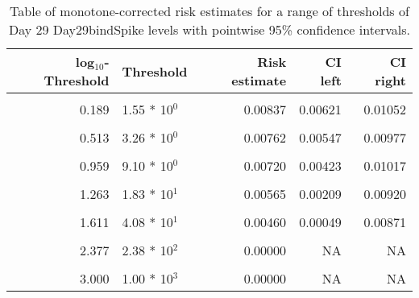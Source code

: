 \documentclass[]{article}
\begin{document}
\begin{table}[!h]

\caption{\label{tab:unnamed-chunk-44}Table of monotone-corrected risk estimates for a range of thresholds of Day 29 Day29bindSpike levels with pointwise 95\% confidence intervals.}
\centering
\begin{tabular}[t]{rlrrr}
\toprule
log$_{10}$-Threshold & Threshold & Risk estimate & CI left & CI right\\
\midrule
\cellcolor{gray!6}{-0.813} & \cellcolor{gray!6}{1.54 * 10$^{1}$} & \cellcolor{gray!6}{0.00878} & \cellcolor{gray!6}{0.00676} & \cellcolor{gray!6}{0.01080}\\
0.189 & 1.55 * 10$^{0}$ & 0.00837 & 0.00621 & 0.01052\\
\cellcolor{gray!6}{0.341} & \cellcolor{gray!6}{2.19 * 10$^{0}$} & \cellcolor{gray!6}{0.00820} & \cellcolor{gray!6}{0.00605} & \cellcolor{gray!6}{0.01034}\\
0.513 & 3.26 * 10$^{0}$ & 0.00762 & 0.00547 & 0.00977\\
\cellcolor{gray!6}{0.792} & \cellcolor{gray!6}{6.19 * 10$^{0}$} & \cellcolor{gray!6}{0.00749} & \cellcolor{gray!6}{0.00506} & \cellcolor{gray!6}{0.00993}\\
0.959 & 9.10 * 10$^{0}$ & 0.00720 & 0.00423 & 0.01017\\
\cellcolor{gray!6}{1.113} & \cellcolor{gray!6}{1.30 * 10$^{1}$} & \cellcolor{gray!6}{0.00639} & \cellcolor{gray!6}{0.00297} & \cellcolor{gray!6}{0.00981}\\
1.263 & 1.83 * 10$^{1}$ & 0.00565 & 0.00209 & 0.00920\\
\cellcolor{gray!6}{1.491} & \cellcolor{gray!6}{3.10 * 10$^{1}$} & \cellcolor{gray!6}{0.00460} & \cellcolor{gray!6}{0.00103} & \cellcolor{gray!6}{0.00818}\\
1.611 & 4.08 * 10$^{1}$ & 0.00460 & 0.00049 & 0.00871\\
\cellcolor{gray!6}{1.729} & \cellcolor{gray!6}{5.36 * 10$^{1}$} & \cellcolor{gray!6}{0.00397} & \cellcolor{gray!6}{0.00068} & \cellcolor{gray!6}{0.00726}\\
2.377 & 2.38 * 10$^{2}$ & 0.00000 & NA & NA\\
\cellcolor{gray!6}{2.699} & \cellcolor{gray!6}{5.00 * 10$^{2}$} & \cellcolor{gray!6}{0.00000} & \cellcolor{gray!6}{NA} & \cellcolor{gray!6}{NA}\\
3.000 & 1.00 * 10$^{3}$ & 0.00000 & NA & NA\\
\bottomrule
\end{tabular}
\end{table}
\end{document}
